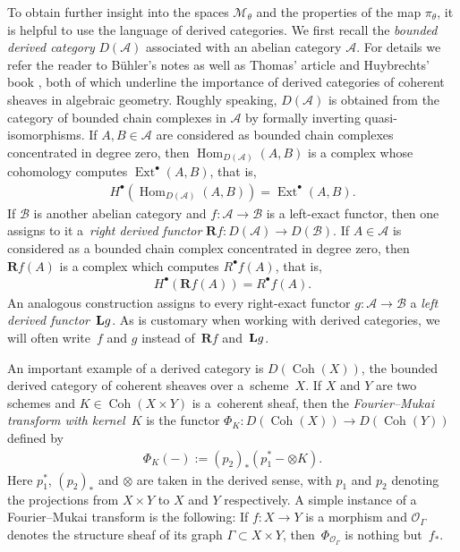 \documentclass[pdftex]{sigma}
\numberwithin{equation}{section}
\newcommand{\bL}{{\bf L}}
\newcommand{\sA}{\mathscr{A}}
\newcommand{\sB}{\mathscr{B}}
\newcommand{\sM}{\mathscr{M}}
\newcommand{\sO}{\mathscr{O}}
\newcommand{\Coh}{\operatorname{Coh}}
\newcommand{\Hom}{\operatorname{Hom}}
\newcommand{\Ext}{\operatorname{Ext}}
\begin{document}
To obtain further insight into the spaces $\sM_{\theta}$ and the
properties of the map $\pi_{\theta}$, it is helpful to use the
language of derived categories.  We f\/irst recall the \emph{bounded
  derived category} $D(\sA)$ associated with an abelian category
$\sA$.  For details we refer the reader to B\"uhler's notes
\cite{Buehler2007} as well as Thomas' article \cite{Thomas2001} and
Huybrechts' book \cite{Huybrechts2006}, both of which underline the
importance of derived categories of coherent sheaves in algebraic
geometry.  Roughly speaking, $D(\sA)$ is obtained from the category of
bounded chain complexes in $\sA$ by formally inverting
quasi-isomorphisms.  If $A,B\in\sA$ are considered as bounded chain
complexes concentrated in degree zero, then $\Hom_{D(\sA)}(A,B)$ is a
complex whose cohomology computes $\Ext^\bullet(A,B)$, that is,
\begin{gather*}
  H^\bullet(\Hom_{D(\sA)}(A,B))=\Ext^\bullet(A,B).
\end{gather*}
If $\sB$  is another abelian category and $f\colon \sA \to \sB$ is a
left-exact functor, then one assigns to it a~\emph{right derived
  functor} ${\mathbf R} f \colon D(\sA) \to D(\sB)$.  If $A\in\sA$ is considered
as a bounded chain complex concentrated in degree zero, then ${\mathbf R} f(A)$ is a complex which computes $R^\bullet f(A)$, that is,
\begin{gather*}
  H^\bullet({\mathbf R} f(A))=R^\bullet f(A).
\end{gather*}
An analogous construction assigns to every right-exact functor $g
\colon \sA \to \sB$ a \emph{left derived functor}~$\bL g$.  As is
customary when working with derived categories, we will often write~$f$ and $g$ instead of~${\mathbf R} f$ and~$\bL g$.

An important example of a derived category is $D(\Coh(X))$, the
bounded derived category of coherent sheaves over a~scheme~$X$.  If
$X$ and $Y$ are two schemes and $K\in\Coh(X\times Y)$ is a~co\-he\-rent
sheaf, then the \emph{Fourier--Mukai transform with kernel~$K$} is the
functor $\Phi_K\colon D(\Coh(X))\to D(\Coh(Y))$ def\/ined by
\begin{gather*}
  \Phi_K(-):=(p_2)_*(p_1^*-\otimes K).
\end{gather*}
Here $p_1^*$, $(p_2)_*$ and $\otimes$ are taken in the derived sense,
with $p_1$ and $p_2$ denoting the projections from $X\times Y$ to $X$
and $Y$ respectively. A simple instance of a Fourier--Mukai transform
is the following: If $f\colon X\to Y$ is a morphism and $\sO_\Gamma$
denotes the structure sheaf of its graph $\Gamma\subset X\times Y$,
then~$\Phi_{\sO_\Gamma}$ is nothing but~$f_*$.
\end{document}
